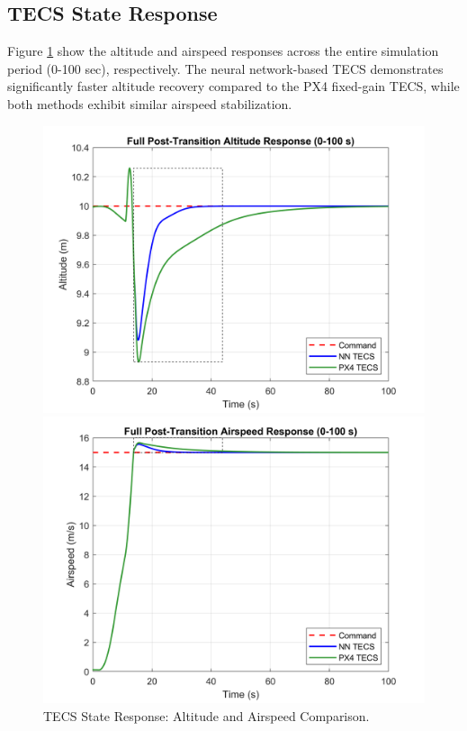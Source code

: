\documentclass[journal,article,submit,pdftex,moreauthors]{Definitions/mdpi}
\begin{document}
\subsection{TECS State Response}
Figure \ref{fig:tecs_state_response} show the altitude and airspeed responses across the entire simulation period (0-100 sec), respectively. The neural network-based TECS demonstrates significantly faster altitude recovery compared to the PX4 fixed-gain TECS, while both methods exhibit similar airspeed stabilization.

\begin{figure}[H]
    \centering
    \begin{minipage}{0.45\textwidth}
        \centering
        \includegraphics[width=\linewidth]{full_altitude_plot.png}
    \end{minipage}
    \hfill
    \begin{minipage}{0.45\textwidth}
        \centering
        \includegraphics[width=\linewidth]{full_airspeed_plot.png}
    \end{minipage}
    \caption{TECS State Response: Altitude and Airspeed Comparison.}
    \label{fig:tecs_state_response}
\end{figure}
\end{document}
